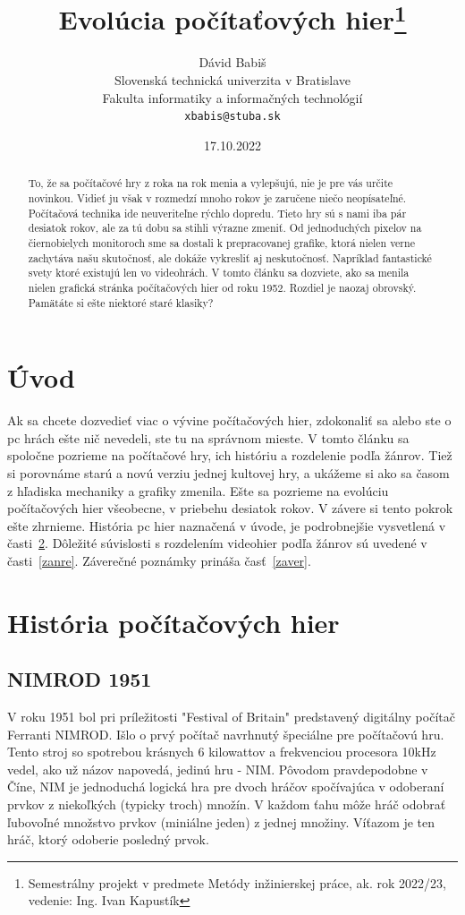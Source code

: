\documentclass[10pt,twoside,slovak,a4paper]{coursepaper}
\title{Evolúcia počítaťových hier\thanks{Semestrálny projekt v predmete Metódy inžinierskej práce, ak. rok 2022/23, vedenie: Ing. Ivan Kapustík}} %
\author{Dávid Babiš\\[2pt]
	{\small Slovenská technická univerzita v Bratislave}\\
	{\small Fakulta informatiky a informačných technológií}\\
	{\small \texttt{xbabis@stuba.sk}}
	}
\date{\small 17.10.2022} %
\begin{document}
\maketitle

\begin{abstract}
To, že sa počítačové hry z roka na rok menia a vylepšujú, nie je pre vás určite novinkou. Vidieť ju však v rozmedzí mnoho rokov je zaručene niečo neopísateľné. Počítačová technika ide neuveriteľne rýchlo dopredu. Tieto hry sú s nami iba pár desiatok rokov, ale za tú dobu sa stihli výrazne zmeniť. Od jednoduchých pixelov na čiernobielych monitoroch sme sa dostali k prepracovanej grafike, ktorá nielen verne zachytáva našu skutočnosť, ale dokáže vykresliť aj neskutočnosť. Napríklad fantastické svety ktoré existujú len vo videohrách.  V tomto článku sa dozviete, ako sa menila nielen grafická stránka počítačových hier od roku 1952. Rozdiel je naozaj obrovský. Pamätáte si ešte niektoré staré klasiky?
\end{abstract}



\section{Úvod}
Ak sa chcete dozvedieť viac o vývine počítačových hier, zdokonaliť sa alebo ste o pc hrách ešte nič nevedeli, ste tu na správnom mieste. V tomto článku sa spoločne pozrieme na počítačové hry, ich históriu a rozdelenie podľa žánrov. Tiež si porovnáme starú a novú verziu jednej kultovej hry, a ukážeme si ako sa časom z hľadiska mechaniky a grafiky zmenila. Ešte sa pozrieme na evolúciu počítačových hier všeobecne, v priebehu desiatok rokov. V závere si tento pokrok ešte zhrnieme. História pc hier naznačená v úvode, je podrobnejšie vysvetlená v časti~\ref{historia}.
Dôležité súvislosti s rozdelením videohier podľa žánrov sú uvedené v časti~\ref{zanre}.
Záverečné poznámky prináša časť~\ref{zaver}.

\section{História počítačových hier} \label{historia}

\subsection{NIMROD 1951}

V roku 1951 bol pri príležitosti "Festival of Britain" predstavený digitálny počítač Ferranti NIMROD. Išlo o prvý počítač navrhnutý špeciálne pre počítačovú hru. Tento stroj so spotrebou krásnych 6 kilowattov a frekvenciou procesora 10kHz vedel, ako už názov napovedá, jedinú hru - NIM. Pôvodom pravdepodobne v Číne, NIM je jednoduchá logická hra pre dvoch hráčov spočívajúca v odoberaní prvkov z niekoľkých (typicky troch) množín. V každom ťahu môže hráč odobrať ľubovoľné množstvo prvkov (miniálne jeden) z jednej množiny. Víťazom je ten hráč, ktorý odoberie posledný prvok.
\end{document}
